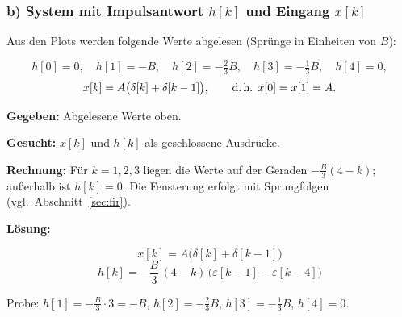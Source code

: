 \subsubsection*{b) System mit Impulsantwort $h[k]$ und Eingang $x[k]$}

Aus den Plots werden folgende Werte abgelesen (Sprünge in Einheiten von $B$):

$$
h[0]=0,\quad h[1]=-B,\quad h[2]=-\tfrac{2}{3}B,\quad
h[3]=-\tfrac{1}{3}B,\quad h[4]=0,
$$
$$
x[k]=A\bigl(\delta[k]+\delta[k-1]\bigr),\qquad
\text{d.\,h. } x[0]=x[1]=A .
$$

\begin{center}
\end{center}

\begin{beispiel}

\textbf{Gegeben:} Abgelesene Werte oben.

\textbf{Gesucht:} $x[k]$ und $h[k]$ als geschlossene Ausdrücke.

\textbf{Rechnung:} Für $k=1,2,3$ liegen die Werte auf der Geraden
$-\tfrac{B}{3}(4-k)$; außerhalb ist $h[k]=0$. Die Fensterung erfolgt mit
Sprungfolgen (vgl.\ Abschnitt~\ref{sec:fir}).

\textbf{Lösung:}

$$
\boxed{\,x[k] = A\bigl(\delta[k]+\delta[k-1]\bigr)\,}
$$
$$
\boxed{\,h[k] = -\frac{B}{3}\,(4-k)\,\bigl(\varepsilon[k-1]-\varepsilon[k-4]\bigr)\,}
$$

Probe: $h[1]=-\tfrac{B}{3}\cdot3=-B$, $h[2]=-\tfrac{2}{3}B$,
$h[3]=-\tfrac{1}{3}B$, $h[4]=0$. \checkmark

\end{beispiel}

